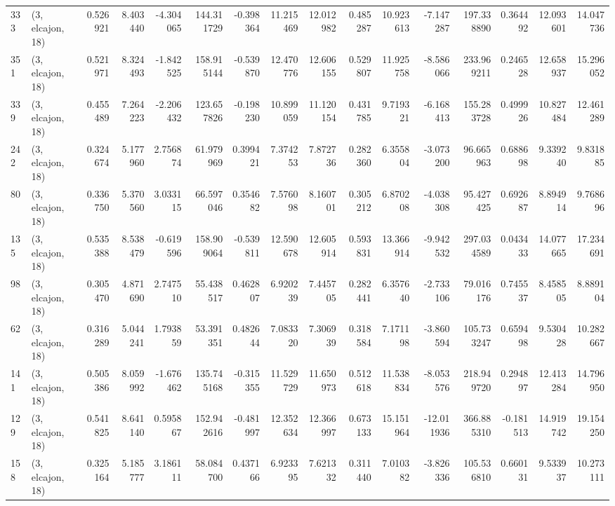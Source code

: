 \begin{tabular}{llrrrrrrrrrrrrrr}
333 &  (3, elcajon, 18) &   0.526921 &   8.403440 &  -4.304065 &   144.311729 &  -0.398364 &  11.215469 &  12.012982 &  0.485287 &  10.923613 &  -7.147287 &   197.338890 &  0.364492 &  12.093601 &  14.047736 \\
351 &  (3, elcajon, 18) &   0.521971 &   8.324493 &  -1.842525 &   158.915144 &  -0.539870 &  12.470776 &  12.606155 &  0.529807 &  11.925758 &  -8.586066 &   233.969211 &  0.246528 &  12.658937 &  15.296052 \\
339 &  (3, elcajon, 18) &   0.455489 &   7.264223 &  -2.206432 &   123.657826 &  -0.198230 &  10.899059 &  11.120154 &  0.431785 &   9.719321 &  -6.168413 &   155.283728 &  0.499926 &  10.827484 &  12.461289 \\
242 &  (3, elcajon, 18) &   0.324674 &   5.177960 &   2.756874 &    61.979969 &   0.399421 &   7.374253 &   7.872736 &  0.282360 &   6.355804 &  -3.073200 &    96.665963 &  0.688698 &   9.339240 &   9.831885 \\
80  &  (3, elcajon, 18) &   0.336750 &   5.370560 &   3.033115 &    66.597046 &   0.354682 &   7.576098 &   8.160701 &  0.305212 &   6.870208 &  -4.038308 &    95.427425 &  0.692687 &   8.894914 &   9.768696 \\
135 &  (3, elcajon, 18) &   0.535388 &   8.538479 &  -0.619596 &   158.909064 &  -0.539811 &  12.590678 &  12.605914 &  0.593831 &  13.366914 &  -9.942532 &   297.034589 &  0.043433 &  14.077665 &  17.234691 \\
98  &  (3, elcajon, 18) &   0.305470 &   4.871690 &   2.747510 &    55.438517 &   0.462807 &   6.920239 &   7.445705 &  0.282441 &   6.357640 &  -2.733106 &    79.016176 &  0.745537 &   8.458505 &   8.889104 \\
62  &  (3, elcajon, 18) &   0.316289 &   5.044241 &   1.793859 &    53.391351 &   0.482644 &   7.083320 &   7.306939 &  0.318584 &   7.171198 &  -3.860594 &   105.733247 &  0.659498 &   9.530428 &  10.282667 \\
141 &  (3, elcajon, 18) &   0.505386 &   8.059992 &  -1.676462 &   135.745168 &  -0.315355 &  11.529729 &  11.650973 &  0.512618 &  11.538834 &  -8.053576 &   218.949720 &  0.294897 &  12.413284 &  14.796950 \\
129 &  (3, elcajon, 18) &   0.541825 &   8.641140 &   0.595867 &   152.942616 &  -0.481997 &  12.352634 &  12.366997 &  0.673133 &  15.151964 & -12.011936 &   366.885310 & -0.181513 &  14.919742 &  19.154250 \\
158 &  (3, elcajon, 18) &   0.325164 &   5.185777 &   3.186111 &    58.084700 &   0.437166 &   6.923395 &   7.621332 &  0.311440 &   7.010382 &  -3.826336 &   105.536810 &  0.660131 &   9.533937 &  10.273111 \\

\end{tabular}
